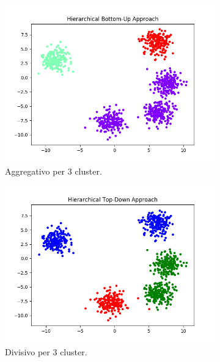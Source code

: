 \documentclass{llncs}
\begin{document}
	\begin{figure}[h]
		\begin{subfigure}{.5\textwidth}
		  \centering
		  \includegraphics[width=\linewidth]{immagini/5_clusters_agg_3.png}
		  \caption{Aggregativo per 3 cluster.}
		  \label{hier:a}
		\end{subfigure}%
		\begin{subfigure}{.5\textwidth}
		  \centering
		  \includegraphics[width=\linewidth]{immagini/5_clusters_div_3.png}
		  \caption{Divisivo per 3 cluster.}
		  \label{hier:b}
		\end{subfigure}
		\begin{subfigure}{.5\textwidth}
			\centering

\end{subfigure}
\end{figure}
\end{document}
